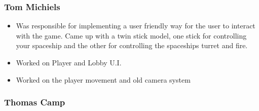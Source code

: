 \documentclass[11pt,a4paper]{article}
\begin{document}
        \subsubsection{Tom Michiels}

        \begin{itemize}
          \item Was responsible for implementing a user friendly way for the user to interact with the game. Came up with a twin stick model, one stick for controlling your spaceship and the other for controlling the spaceships turret and fire.
          \item Worked on Player and Lobby U.I.
          \item Worked on the player movement and old camera system
        \end{itemize}

        \pagebreak

        \subsubsection{Thomas Camp}
\end{document}
